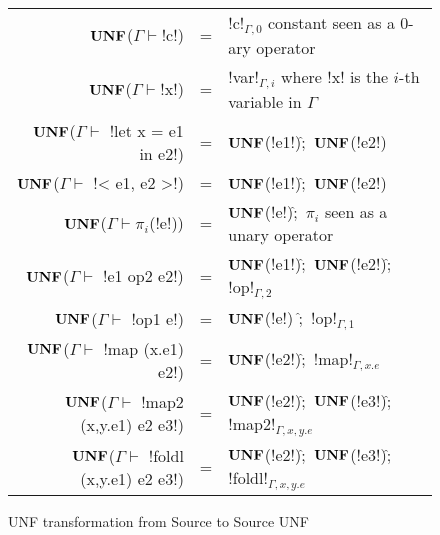 \begin{figure*}[t]
    \begin{tabular}{r c l}
    $\mathbf{UNF}$($\Gamma\vdash $!c!) &=& !c!$_{\Gamma,0}$ constant seen as a 0-ary operator\\
    $\mathbf{UNF}$($\Gamma\vdash $!x!) &=& !var!$_{\Gamma,i}$ where !x! is the $i$-th variable in $\Gamma$ \\
    $\mathbf{UNF}$($\Gamma\vdash $ !let x = e1 in e2!) &=& $\mathbf{UNF}$(!e1!)$\widehat{;}$ $\mathbf{UNF}$(!e2!) \\ 
    $\mathbf{UNF}$($\Gamma\vdash $ !< e1, e2 >!) &=& $\mathbf{UNF}$(!e1!)$\widehat{;}$ $\mathbf{UNF}$(!e2!) \\ 
    $\mathbf{UNF}$($\Gamma\vdash \pi_i$(!e!)) &=& $\mathbf{UNF}$(!e!)$\widehat{;}$ $\pi_i$ seen as a unary operator\\
    $\mathbf{UNF}$($\Gamma\vdash $ !e1 op2 e2!) &=& $\mathbf{UNF}$(!e1!)$\widehat{;}$ $\mathbf{UNF}$(!e2!)$\widehat{;}$ !op!$_{\Gamma,2}$\\
    $\mathbf{UNF}$($\Gamma\vdash $ !op1 e!) &=& $\mathbf{UNF}$(!e!) $\widehat{;}$ !op!$_{\Gamma,1}$ \\
    $\mathbf{UNF}$($\Gamma\vdash $ !map (x.e1) e2!) &=& $\mathbf{UNF}$(!e2!)$\widehat{;}$ !map!$_{\Gamma,x.e}$\\
    $\mathbf{UNF}$($\Gamma\vdash $ !map2 (x,y.e1) e2 e3!) &=& $\mathbf{UNF}$(!e2!)$\widehat{;}$ $\mathbf{UNF}$(!e3!)$\widehat{;}$ !map2!$_{\Gamma, x,y.e}$ \\ 
    $\mathbf{UNF}$($\Gamma\vdash $ !foldl (x,y.e1) e2 e3!) &=& $\mathbf{UNF}$(!e2!)$\widehat{;}$ $\mathbf{UNF}$(!e3!)$\widehat{;}$ !foldl!$_{\Gamma, x,y.e}$ \\  
    \end{tabular}
    \caption{UNF transformation from Source to Source UNF}
    \label{fig:source_to_unf}
    \end{figure*}